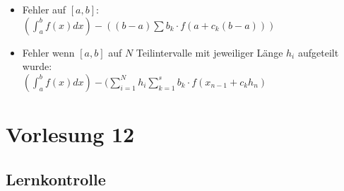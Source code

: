 \documentclass[]{article}
\begin{document}
\begin{enumerate}
			\begin{itemize}
				\item Fehler auf $[a,b]$: \\
						$( \int_a^b f(x) dx ) - ( (b-a)\sum b_k \cdot f(a+c_k(b-a)))$
				\item Fehler wenn $[a,b]$ auf $N$ Teilintervalle mit jeweiliger Länge $h_i$ aufgeteilt wurde: \\
						$( \int_a^b f(x) dx ) - ( \sum_{i=1}^N h_i \sum_{k=1}^s b_k \cdot f(x_{n-1} + c_k h_n )$ 
			\end{itemize}
	\end{enumerate}

\section{Vorlesung 12}
\subsection{Lernkontrolle}
\end{document}
